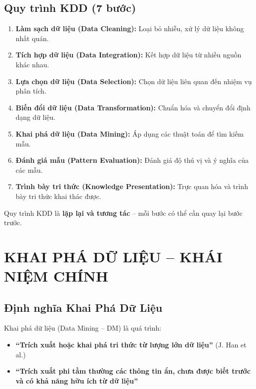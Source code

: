 \documentclass[10pt]{article}
\begin{document}
\subsection{Quy trình KDD (7 bước)}

\begin{enumerate}
    \item \textbf{Làm sạch dữ liệu (Data Cleaning):} Loại bỏ nhiễu, xử lý dữ liệu không nhất quán.
    \item \textbf{Tích hợp dữ liệu (Data Integration):} Kết hợp dữ liệu từ nhiều nguồn khác nhau.
    \item \textbf{Lựa chọn dữ liệu (Data Selection):} Chọn dữ liệu liên quan đến nhiệm vụ phân tích.
    \item \textbf{Biến đổi dữ liệu (Data Transformation):} Chuẩn hóa và chuyển đổi định dạng dữ liệu.
    \item \textbf{Khai phá dữ liệu (Data Mining):} Áp dụng các thuật toán để tìm kiếm mẫu.
    \item \textbf{Đánh giá mẫu (Pattern Evaluation):} Đánh giá độ thú vị và ý nghĩa của các mẫu.
    \item \textbf{Trình bày tri thức (Knowledge Presentation):} Trực quan hóa và trình bày tri thức khai thác được.
\end{enumerate}

Quy trình KDD là \textbf{lặp lại và tương tác} -- mỗi bước có thể cần quay lại bước trước.

\section{KHAI PHÁ DỮ LIỆU -- KHÁI NIỆM CHÍNH}

\subsection{Định nghĩa Khai Phá Dữ Liệu}

Khai phá dữ liệu (Data Mining -- DM) là quá trình:
\begin{itemize}
    \item \textbf{``Trích xuất hoặc khai phá tri thức từ lượng lớn dữ liệu''} (J. Han et al.)
    \item \textbf{``Trích xuất phi tầm thường các thông tin ẩn, chưa được biết trước và có khả năng hữu ích từ dữ liệu''}
\end{itemize}
\end{document}
